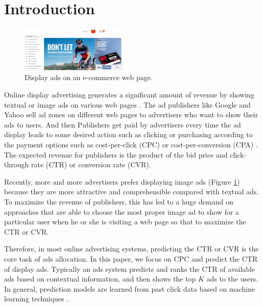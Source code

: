 \documentclass{sig-alternate}
\begin{document}
\section{Introduction}
\begin{figure}
	\centering
	\includegraphics[width=0.45\textwidth]{ad}
	\caption{Display ads on an e-commerce web page.}
	\label{fig:ad}
\end{figure}
Online display advertising generates a significant amount of revenue by showing textual or image ads on various web pages \cite{chapelle2014simple}.   The ad publishers like Google and Yahoo sell  ad zones on different web pages to advertisers who want to show their ads to users. And then Publishers get paid by advertisers every time the ad display leads to some desired action  such as clicking or purchasing according to the payment options such as cost-per-click (CPC) or cost-per-conversion (CPA) \cite{mahdian2007pay}. The expected revenue for publishers is the product of the bid price and click-through rate (CTR) or conversion rate (CVR).

Recently, more and more advertisers prefer displaying image ads \cite{mei2011internet} (Figure \ref{fig:ad}) because they are more attractive and comprehensible compared with textual ads.   To maximize the revenue of publishers,  this has led to a huge demand on approaches that are able to choose the most proper image ad to show for a particular user when he or she is visiting a web page so that to maximize the CTR or CVR. 

Therefore, in most online advertising systems, predicting the CTR or CVR is the core task of ads allocation.  In this paper, we focus on CPC and predict the CTR of display ads. Typically an ads system  predicts and ranks the CTR of available ads based on contextual information, and then shows the top $K$ ads to the users. In general, prediction models are learned from past click data based on machine learning techniques \cite{chapelle2014simple,  richardson2007predicting, he2014practical, dave2010learning, zhang2016deep,mcmahan2013ad}.
\end{document}
